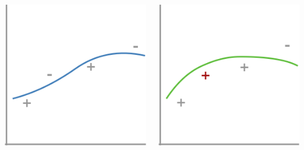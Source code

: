 \documentclass[presentation]{subfiles}
\begin{document}
\begin{frame}[t]
\begin{columns}
\begin{column}{0.16\textwidth}
{\includegraphics[width=\textwidth]{figures/sla_3.png}}



\end{column}

\begin{column}{0.16\textwidth}

{\includegraphics[width=\textwidth]{figures/sla_4.png}}


\end{column}
\end{columns}
\end{frame}
\end{document}
